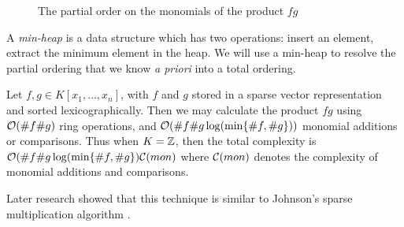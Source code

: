 \begin{figure}
    \center
    \caption{The partial order on the monomials of the product $fg$}
    \label{fig:ordering}
\end{figure}

A \textit{min-heap} is a data structure which has two operations: insert an element, extract the minimum element in the heap. We will use a min-heap to resolve the partial ordering that we know \textit{a priori} into a total ordering.

\begin{theorem}
    Let $f, g \in K[x_1, \ldots, x_n]$, with $f$ and $g$ stored in a sparse vector representation and sorted lexicographically.
    Then we may calculate the product $fg$ using $\mathcal O(\# f \# g)$ ring operations, and $\mathcal O(\# f \# g \log ( \min \{\# f, \# g\}))$ monomial additions or comparisons. Thus when $K = {\mathbb Z}$, then the total complexity is $\mathcal O(\# f \# g \log ( \min \{\# f, \# g\})\mathcal C(mon)$ where $\mathcal C(mon)$ denotes the complexity of monomial additions and comparisons.
\end{theorem}

Later research showed that this technique is similar to Johnson's sparse multiplication algorithm \cite{johnson-sparse-polynomial}.

